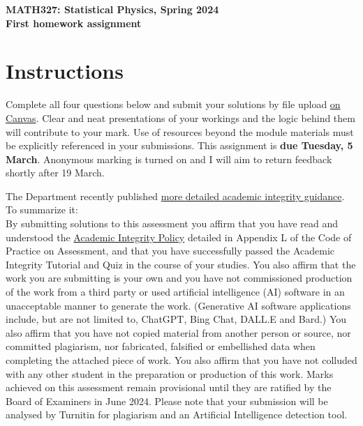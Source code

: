 \documentclass[12 pt]{article} %
\begin{document}
\newcommand{\thisweek}{MATH327 Homework 1}
\newcommand{\moddate}{Last modified 26 Feb.~2024}
\begin{center}
  {\Large \textbf{MATH327: Statistical Physics, Spring 2024}} \\[12 pt]
  {\Large \textbf{First homework assignment}} \\[24 pt]
\end{center}

\section*{Instructions}
Complete all four questions below and submit your solutions by file upload \href{https://canvas.liverpool.ac.uk/courses/69036/assignments/263584}{on Canvas}.
Clear and neat presentations of your workings and the logic behind them will contribute to your mark.
Use of resources beyond the module materials must be explicitly referenced in your submissions.
This assignment is \textbf{due Tuesday, 5 March}.
Anonymous marking is turned on and I will aim to return feedback shortly after 19 March.

\vfill
The Department recently published \href{https://canvas.liverpool.ac.uk/files/10656162/}{more detailed academic integrity guidance}.
To summarize it: \\
By submitting solutions to this assessment you affirm that you have read and understood the \href{https://www.liverpool.ac.uk/media/livacuk/tqsd/code-of-practice-on-assessment/appendix_L_cop_assess.pdf}{Academic Integrity Policy} detailed in Appendix L of the Code of Practice on Assessment, and that you have successfully passed the Academic Integrity Tutorial and Quiz in the course of your studies.
You also affirm that the work you are submitting is your own and you have not commissioned production of the work from a third party or used artificial intelligence (AI) software in an unacceptable manner to generate the work.
(Generative AI software applications include, but are not limited to, ChatGPT, Bing Chat, DALL.E and Bard.)
You also affirm that you have not copied material from another person or source, nor committed plagiarism, nor fabricated, falsified or embellished data when completing the attached piece of work.
You also affirm that you have not colluded with any other student in the preparation or production of this work.
Marks achieved on this assessment remain provisional until they are ratified by the Board of Examiners in June 2024.
Please note that your submission will be analysed by Turnitin for plagiarism and an Artificial Intelligence detection tool.
\end{document}
